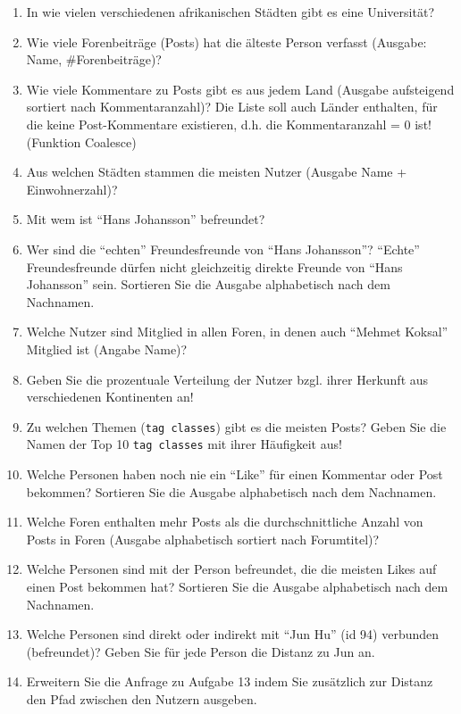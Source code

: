 \begin{enumerate}
    \item In wie vielen verschiedenen afrikanischen Städten gibt es eine Universität?
    \item Wie viele Forenbeiträge (Posts) hat die älteste Person verfasst (Ausgabe: Name, \#Forenbeiträge)?
    \item Wie viele Kommentare zu Posts gibt es aus jedem Land (Ausgabe aufsteigend sortiert nach Kommentaranzahl)? Die Liste soll auch Länder enthalten, für die keine Post-Kommentare existieren, d.h. die Kommentaranzahl = 0 ist! (Funktion Coalesce)
    \item Aus welchen Städten stammen die meisten Nutzer (Ausgabe Name + Einwohnerzahl)?
    \item Mit wem ist \enquote{Hans Johansson} befreundet?
    \item Wer sind die \enquote{echten} Freundesfreunde von \enquote{Hans Johansson}? \enquote{Echte} Freundesfreunde dürfen nicht gleichzeitig direkte Freunde von \enquote{Hans Johansson} sein. Sortieren Sie die Ausgabe alphabetisch nach dem Nachnamen.
    \item Welche Nutzer sind Mitglied in allen Foren, in denen auch \enquote{Mehmet Koksal} Mitglied ist (Angabe Name)?
    \item Geben Sie die prozentuale Verteilung der Nutzer bzgl. ihrer Herkunft aus verschiedenen Kontinenten an!
    \item Zu welchen Themen (\texttt{tag classes}) gibt es die meisten Posts? Geben Sie die Namen der Top 10 \texttt{tag classes} mit ihrer Häufigkeit aus!
    \item Welche Personen haben noch nie ein \enquote{Like} für einen Kommentar oder Post bekommen? Sortieren Sie die Ausgabe alphabetisch nach dem Nachnamen.
    \item Welche Foren enthalten mehr Posts als die durchschnittliche Anzahl von Posts in Foren (Ausgabe alphabetisch sortiert nach Forumtitel)?
    \item Welche Personen sind mit der Person befreundet, die die meisten Likes auf einen Post bekommen hat? Sortieren Sie die Ausgabe alphabetisch nach dem Nachnamen.
    \item Welche Personen sind direkt oder indirekt mit \enquote{Jun Hu} (id 94) verbunden (befreundet)? Geben Sie für jede Person die Distanz zu Jun an.
    \item Erweitern Sie die Anfrage zu Aufgabe 13 indem Sie zusätzlich zur Distanz den Pfad zwischen den Nutzern ausgeben.
\end{enumerate}


